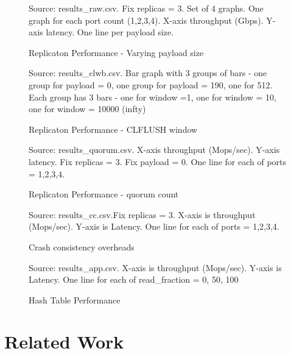 \documentclass[twocolumn]{article}
\begin{document}
\begin{figure}
  Source: results_raw.csv. Fix replicas = 3. Set of 4 graphs. One graph for each
  port count (1,2,3,4). X-axis throughput (Gbps). Y-axis latency. One line per
  payload size.
  \caption{Replicaton Performance - Varying payload size}
  \label{fig:perf_payload}
\end{figure}

\begin{figure}
  Source: results_clwb.csv. Bar graph with 3 groups of bars - one group for
  payload = 0, one group for payload = 190, one for 512. Each group has 3 bars -
  one for window =1, one for window = 10, one for window = 10000 (infty)
  \caption{Replicaton Performance - CLFLUSH window}
  \label{fig:perf_clflush}
\end{figure}

\begin{figure}
  Source: results_quorum.csv. X-axis throughput (Mops/sec). Y-axis latency. Fix
  replicas = 3. Fix payload = 0. One line for each of ports = 1,2,3,4.
  \caption{Replicaton Performance - quorum count}
  \label{fig:perf_quorums}
\end{figure}

\begin{figure}
  Source: results_cc.csv.Fix replicas = 3. X-axis is throughput
  (Mops/sec). Y-axis is Latency. One line for each of ports = 1,2,3,4.
  \caption{Crash consistency overheads}
  \label{fig:perf_cc}
\end{figure}

\begin{figure}
  Source: results_app.csv. X-axis is throughput
  (Mops/sec). Y-axis is Latency. One line for each of read_fraction = 0, 50, 100
  \caption{Hash Table Performance}
  \label{fig:perf_app}
\end{figure}



\section{Related Work}
\end{document}
